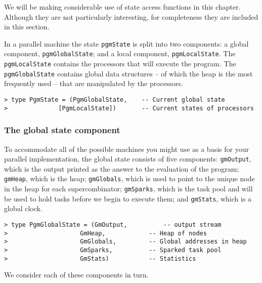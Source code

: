 We will be making considerable use of state access functions in this
chapter. Although they are not particularly interesting, for
completeness they are included in this section.

In a parallel machine the state \mbox{\tt pgmState} is split into two
components: a global component, \mbox{\tt pgmGlobalState}; and a local
component, \mbox{\tt pgmLocalState}. The \mbox{\tt pgmLocalState} contains the
processors that will execute the program. The \mbox{\tt pgmGlobalState}
contains global data structures -- of which the heap is the most
frequently used -- that are manipulated by the processors.

\begin{verbatim}
> type PgmState = (PgmGlobalState,    -- Current global state
>              [PgmLocalState])       -- Current states of processors
\end{verbatim}
%

\subsubsection{The global state component}

To accommodate all of the possible machines you might use as a basis
for your parallel implementation, the global state consists of five
components: \mbox{\tt gmOutput}, which is the output printed as the answer
to the evaluation of the program; \mbox{\tt gmHeap}, which is the heap;
\mbox{\tt gmGlobals}, which is used to point to the unique node in the heap for
each supercombinator; \mbox{\tt gmSparks}, which is the task pool and will
be used to hold tasks before we begin to execute them; and \mbox{\tt gmStats},
which is a global clock.

\begin{verbatim}
> type PgmGlobalState = (GmOutput,          -- output stream
>                    GmHeap,            -- Heap of nodes
>                    GmGlobals,         -- Global addresses in heap
>                    GmSparks,          -- Sparked task pool
>                    GmStats)           -- Statistics
\end{verbatim}
%
We consider each of these components in turn.

